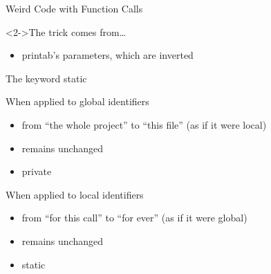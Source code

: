 \begin{Coupe}
\begin{frame}{Weird Code with Function Calls}
\begin{minipage}{.56\linewidth}
    \begin{block}<2->{The trick comes from\ldots}
      \begin{itemize}
      \item<3> printab's parameters, which are inverted
      \end{itemize}      
    \end{block}
  \end{minipage}
\end{frame}
\begin{frame}{The keyword static}

  \begin{block}{When applied to global identifiers}
    \begin{itemize}
    \item {} from ``the whole project'' to ``this
      file'' {\small (as if it were local)}
    \item {} remains unchanged

    \item {} private
    \end{itemize}
  \end{block}

  \begin{block}{When applied to local identifiers}
    \begin{itemize}
    \item {} from ``for this call'' to ``for ever''
      {\small (as if it were global)}
    \item {} remains unchanged
    \item {} static
    \end{itemize}
  \end{block}


\end{frame}
\end{Coupe}
